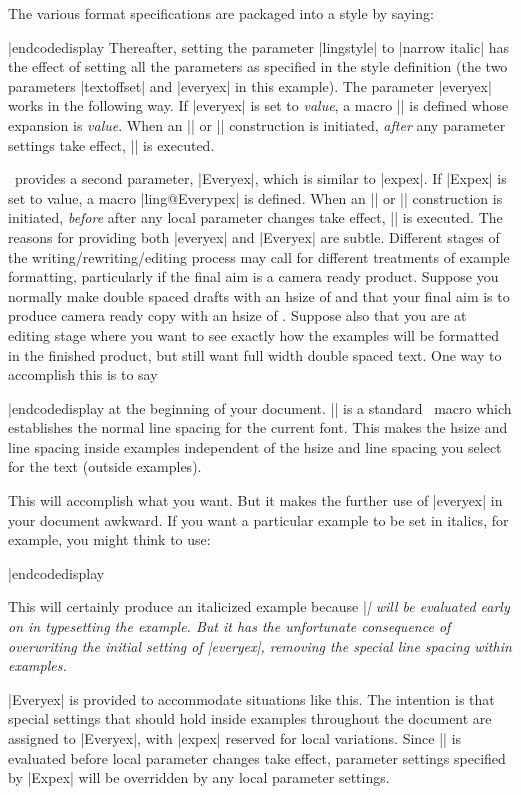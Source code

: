 The various format specifications are packaged into a style
by saying:

\codedisplay
{}
|endcodedisplay
Thereafter, setting the parameter |lingstyle| to |narrow italic|
has the effect of setting all the parameters as specified in the
style definition (the two parameters |textoffset| and |everyex|
in this example). The parameter |everyex| works in the following
way.  If |everyex| is set to {\sl value\/}, a macro |\lingeveryex|
is defined whose expansion is {\sl value}.  When
an |\ex| or |\pex| construction is initiated, {\it after\/} any
parameter settings take effect, |\lingeveryex| is executed.

\ExPex\ provides a second parameter, |Everyex|, which is similar to
|expex|.  If |Expex| is set to value, a macro |ling@Everypex| is
defined. When
an |\ex| or |\pex| construction is initiated, {\it before\/} after any
local parameter changes take effect, |\lingEveryex| is executed.
The reasons for providing both |everyex| and |Everyex| are
subtle. Different stages of the writing/rewriting/editing process
may call for different treatments of example formatting,
particularly if the final aim is a camera ready product.  Suppose
you normally make double spaced drafts with an hsize of
\textdim{6.5 in} and that your final aim is to produce camera ready copy with
an hsize of \textdim{4.375 in}.  Suppose also that you are at
editing stage where you want to see exactly how the examples
will be formatted in the finished product, but still want full width
double spaced text.  One way to accomplish this is to say

\codedisplay
{}
|endcodedisplay
at the beginning of your document.  |\normalbaselines|
is a standard \Tex\ macro which establishes the normal line
spacing for the current font.  This makes the hsize and line
spacing inside examples independent of the hsize and line spacing
you select for the text (outside examples).

This will accomplish what you want.  But it makes the further use
of |everyex| in your document awkward.  If you want a particular
example to be set in italics, for example, you might think to
use:

\codedisplay
\ex[everyex=\it]
|endcodedisplay

\noindent This will certainly produce an italicized example
because |\it| will be evaluated early on in typesetting the
example.  But it has the unfortunate consequence of overwriting
the initial setting of |everyex|, removing the special line
spacing within examples.

|Everyex| is provided to accommodate situations like this. The
intention is that special settings that should hold inside
examples throughout the document are assigned to |Everyex|, with
|expex| reserved for local variations.  Since |\lingEveryex| is
evaluated before local parameter changes take effect, parameter
settings specified by |Expex| will be overridden by any local
parameter settings.


